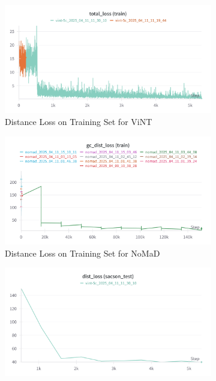 \documentclass[12pt]{article}
\begin{document}
\begin{figure}[H]
    \centering
    \begin{subfigure}[b]{0.48\textwidth}
        \centering
        \includegraphics[width=\textwidth]{images/distloss_vint.png}
        \caption{Distance Loss on Training Set for ViNT}
        \label{fig:vint_action_loss_train}
    \end{subfigure}
    \hfill
    \begin{subfigure}[b]{0.48\textwidth}
        \centering
        \includegraphics[width=\textwidth]{images/gc_distloss_nomad.png}
        \caption{Distance Loss on Training Set for NoMaD}
        \label{fig:vint_action_loss_val}
    \end{subfigure}
    \begin{subfigure}[b]{0.48\textwidth}
        \centering
        \includegraphics[width=\textwidth]{images/dist_test_vint.png}

\end{subfigure}
\end{figure}
\end{document}
